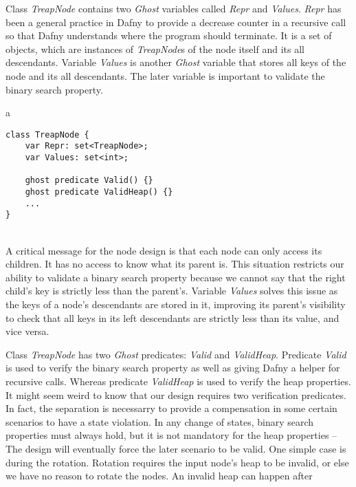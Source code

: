 Class \textit{TreapNode} contains two \textit{Ghost} variables called \textit{Repr} and \textit{Values}. \textit{Repr} has been a general practice in Dafny to provide a decrease counter in a recursive call so that Dafny understands where the program should terminate. It is a set of objects, which are instances of \textit{TreapNode}s of the node itself and its all descendants. Variable \textit{Values} is another \textit{Ghost} variable that stores all keys of the node and its all descendants. The later variable is important to validate the binary search property.\\

\begin{tabular}{a}
\begin{lstlisting}
class TreapNode {
    var Repr: set<TreapNode>;
    var Values: set<int>;

    ghost predicate Valid() {}
    ghost predicate ValidHeap() {}
    ...
}
\end{lstlisting}
\end{tabular}\\

A critical message for the node design is that each node can only access its children. It has no access to know what its parent is. This situation restricts our ability to validate a binary search property because we cannot say that the right child's key is strictly less than the parent's. Variable \textit{Values} solves this issue as the keys of a node's descendants are stored in it, improving its parent's visibility to check that all keys in its left descendants are strictly less than its value, and vice versa.


Class \textit{TreapNode} has two \textit{Ghost} predicates: \textit{Valid} and \textit{ValidHeap}. Predicate \textit{Valid} is used to verify the binary search property as well as giving Dafny a helper for recursive calls. Whereas predicate \textit{ValidHeap} is used to verify the heap properties. It might seem weird to know that our design requires two verification predicates. In fact, the separation is necessarry to provide a compensation in some certain scenarios to have a state violation. In any change of states, binary search properties must always hold, but it is not mandatory for the heap properties -- The design will eventually force the later scenario to be valid. One simple case is during the rotation. Rotation requires the input node's heap to be invalid, or else we have no reason to rotate the nodes. An invalid heap can happen after insertion where the parent of the new node realizes that it has lower heap property.\\

